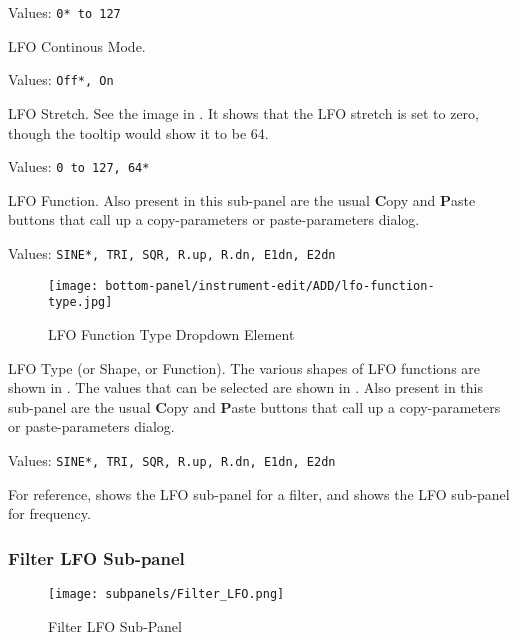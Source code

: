    Values: \texttt{0* to 127}

   LFO Continous Mode.

   Values: \texttt{Off*, On}

   LFO Stretch. See the image in
   .
   It shows that the LFO stretch is set to zero,
   though the tooltip would show it to be 64.

   Values: \texttt{0 to 127, 64*}

   LFO Function.
   Also present in this sub-panel are the usual \textbf{C}opy
   and \textbf{P}aste buttons that call up a copy-parameters or
   paste-parameters dialog.

   Values: \texttt{SINE*, TRI, SQR, R.up, R.dn, E1dn, E2dn}

\begin{figure}[H]
   \centering 
   \texttt{[image: bottom-panel/instrument-edit/ADD/lfo-function-type.jpg]}
   \caption[LFO Type Dropdown]{LFO Function Type Dropdown Element}
   \label{fig:lfo_function_type_dropdown}
\end{figure}

   LFO Type (or Shape, or Function).
   The various shapes of LFO functions are shown in
   .
   The values that can be selected are shown in
   .
   Also present in this sub-panel are the usual \textbf{C}opy
   and \textbf{P}aste buttons that call up a copy-parameters or
   paste-parameters dialog.

   Values: \texttt{SINE*, TRI, SQR, R.up, R.dn, E1dn, E2dn}

   For reference,
   shows the LFO sub-panel for a filter, and
   shows the LFO sub-panel for frequency.

\subsubsection{Filter LFO Sub-panel}
\label{subsubsec:filter_lfo_sub_panel}


\begin{figure}[H]
   \centering 
   \texttt{[image: subpanels/Filter\_LFO.png]}
   \caption[Filter LFO Sub-Panel]{Filter LFO Sub-Panel}
   \label{fig:filter_lfo}
\end{figure}

